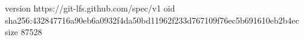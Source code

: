 version https://git-lfs.github.com/spec/v1
oid sha256:432847716a90eb6a0932f4da50bd11962f233d767109f76ec5b691610eb2b4ec
size 87528
